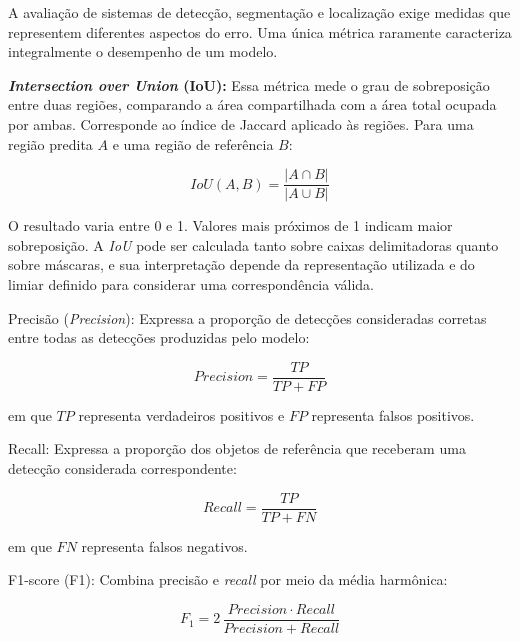 A avalia\c{c}\~ao de sistemas de detec\c{c}\~ao, segmenta\c{c}\~ao e localiza\c{c}\~ao exige medidas que representem diferentes aspectos do erro. Uma \'unica m\'etrica raramente caracteriza integralmente o desempenho de um modelo.

\textbf{\textit{Intersection over Union} (IoU):} Essa m\'etrica mede o grau de sobreposi\c{c}\~ao entre duas regi\~oes, comparando a \'area compartilhada com a \'area total ocupada por ambas. Corresponde ao \'indice de Jaccard aplicado \`as regi\~oes. Para uma regi\~ao predita $A$ e uma regi\~ao de refer\^encia $B$:

\begin{equation}
  \mathit{IoU}(A,B) = \frac{|A \cap B|}{|A \cup B|}
  \label{eq:iou}
\end{equation}

O resultado varia entre 0 e 1. Valores mais pr\'oximos de 1 indicam maior sobreposi\c{c}\~ao. A \textit{IoU} pode ser calculada tanto sobre caixas delimitadoras quanto sobre m\'ascaras, e sua interpreta\c{c}\~ao depende da representa\c{c}\~ao utilizada e do limiar definido para considerar uma correspond\^encia v\'alida.

Precis\~ao (\textit{Precision}): Expressa a propor\c{c}\~ao de detec\c{c}\~oes consideradas corretas entre todas as detec\c{c}\~oes produzidas pelo modelo:

\begin{equation}
  \mathit{Precision} = \frac{TP}{TP + FP}
  \label{eq:precision}
\end{equation}

em que $TP$ representa verdadeiros positivos e $FP$ representa falsos positivos.

Recall: Expressa a propor\c{c}\~ao dos objetos de refer\^encia que receberam uma detec\c{c}\~ao considerada correspondente:

\begin{equation}
  \mathit{Recall} = \frac{TP}{TP + FN}
  \label{eq:recall}
\end{equation}

em que $FN$ representa falsos negativos.

F1-score (F1): Combina precis\~ao e \textit{recall} por meio da m\'edia harm\^onica:

\begin{equation}
  F_1 = 2\,\frac{\mathit{Precision} \cdot \mathit{Recall}}{\mathit{Precision} + \mathit{Recall}}
  \label{eq:f1}
\end{equation}

